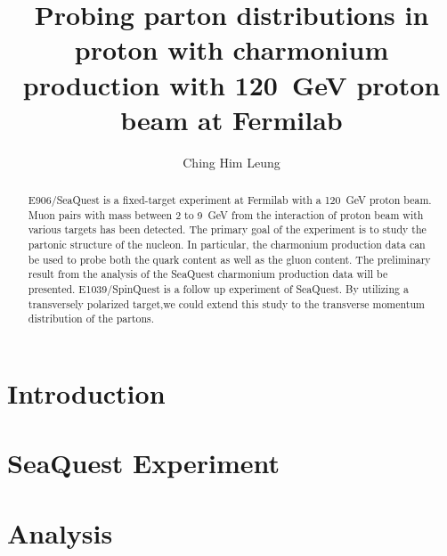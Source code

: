 \documentclass{uiucthesis2021}
\begin{document}
\title{Probing parton distributions in proton with charmonium production with
	\SI{120}{\GeV} proton beam at Fermilab }
\author{Ching Him Leung}

\phdthesis
{}
\maketitle
\frontmatter

\begin{abstract}
E906/SeaQuest is a fixed-target experiment at Fermilab with a \SI{120}{\GeV} 
proton beam. Muon pairs with mass between \num{2} to \SI{9}{\GeV} from the 
interaction of proton beam with various targets has been detected. The primary 
goal of the experiment is to study the partonic structure of the nucleon. In 
particular, the charmonium production data can be used to probe both the quark 
content as well as the gluon content. The preliminary result from the analysis 
of the SeaQuest charmonium production data will be presented.  E1039/SpinQuest 
is a follow up experiment of SeaQuest. By utilizing a transversely polarized 
target,we could extend this study to the transverse momentum distribution of 
the partons. 
\end{abstract}


%

{
	\hypersetup{linkcolor=black}  %
	\tableofcontents
	\listoffigures
}


\mainmatter

\chapter{Introduction}
\label{ch:intro}


\chapter{SeaQuest Experiment}
\label{ch:seaquest}


\chapter{Analysis}
\label{ch:analysis}

\end{document}
